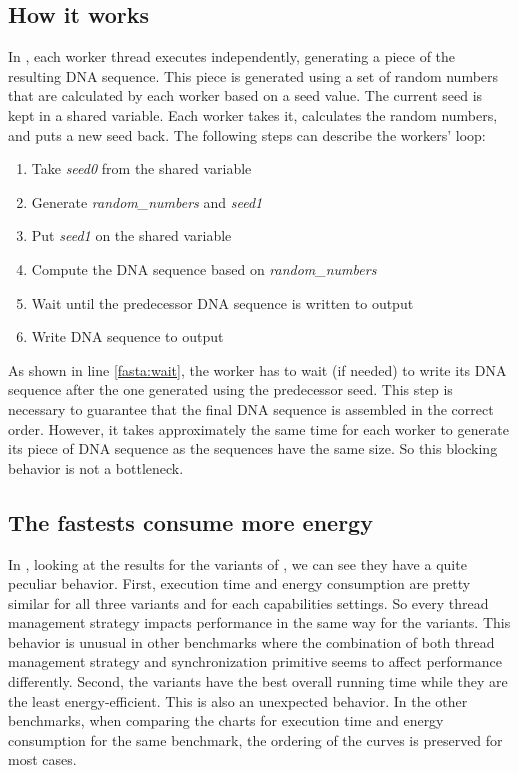 \subsection{How it works}
In \fasta, each worker thread executes independently, generating a piece of the resulting DNA sequence. This piece is generated using a set of random numbers that are calculated by each worker based on a seed value. The current seed is kept in a shared variable. Each worker takes it, calculates the random numbers, and puts a new seed back. The following steps can describe the workers' loop:
\begin{enumerate}
	\item Take \textit{seed0} from the shared variable
	\item Generate \textit{random\_numbers} and \textit{seed1}
	\item Put \textit{seed1} on the shared variable
	\item Compute the DNA sequence based on \textit{random\_numbers}
	\item \label{fasta:wait}Wait until the predecessor DNA sequence is written to output
	\item Write DNA sequence to output
\end{enumerate}

As shown in line \ref{fasta:wait}, the worker has to wait (if needed) to write its DNA sequence after the one generated using the predecessor seed. This step is necessary to guarantee that the final DNA sequence is assembled in the correct order. However, it takes approximately the same time for each worker to generate its piece of DNA sequence as the sequences have the same size. So this blocking behavior is not a bottleneck.

\subsection{The fastests consume more energy}
In , looking at the results for the \TVar variants of \fasta, we can see they have a quite peculiar behavior. First, execution time and energy consumption are pretty similar for all three variants and for each capabilities settings. So every thread management strategy impacts performance in the same way for the \TVar variants. This behavior is unusual in other benchmarks where the combination of both thread management strategy and synchronization primitive seems to affect performance differently. Second, the \TVar variants have the best overall running time while they are the least energy-efficient. This is also an unexpected behavior. In the other benchmarks, when comparing the charts for execution time and energy consumption for the same benchmark, the ordering of the curves is preserved for most cases.

